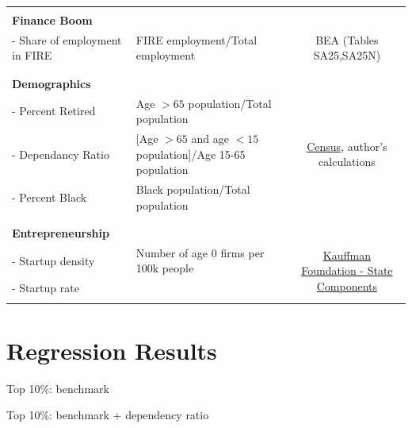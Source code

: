 \documentclass[11pt]{article}
\theoremstyle{definition}
\numberwithin{equation}{section}
\begin{document}
\begin{landscape}
\begin{table}
\begin{tabular}{l|l|c}
	&&\\ \hline 
	&&\\
	{\bf Finance Boom}  &&\\
	- Share of employment in FIRE & FIRE employment/Total employment & BEA (Tables SA25,SA25N)\\
	&&\\ \hline 
	&&\\
	{\bf Demographics}   &&\\
	- Percent Retired  & Age $>65$ population/Total population & \multirow{3}{*}{\href{https://www.census.gov/popest/data/historical/index.html}{Census}, author's calculations } \\
	- Dependancy Ratio & [Age $>65$ and age $<15$ population]/Age 15-65 population&  \\
	- Percent Black & Black population/Total population &  \\
	&&\\ \hline 	
	&&\\ 
	{\bf Entrepreneurship} 	&&\\
	- Startup density &  Number of age 0 firms per 100k people &   \multirow{2}{*}{ \href{http://www.kauffman.org/microsites/kauffman-index/about/archive/kauffman-index-of-entrepreneurial-activity-data-files}{Kauffman Foundation - State Components} } \\
	- Startup rate && \\
	&&\\ \hline 		
\end{tabular}
\end{table}
\end{landscape}



\section{Regression Results}

\begin{footnotesize}
\begin{table}[htb!]
\centering
\caption{Top 10\%: benchmark }

\end{table}
\end{footnotesize}



\clearpage
\newpage
\begin{footnotesize}
\begin{table}[htb!]
\centering
\caption{Top 10\%: benchmark + dependency ratio }

\end{table}
\end{footnotesize}
\end{document}
